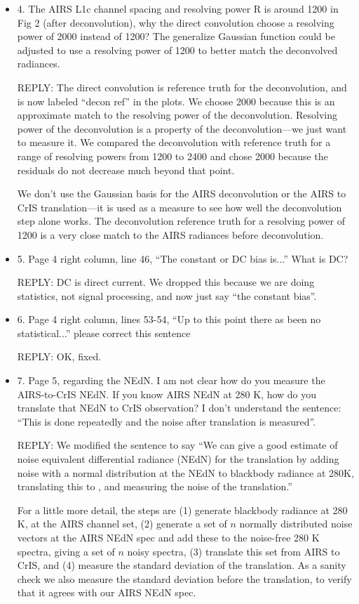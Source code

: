 \documentclass[11pt]{article}
\newcommand {\reply} {\mbox{\small REPLY}}
\begin{document}
\begin{itemize}
  \item 4. The AIRS L1c channel spacing and resolving power R is
    around 1200 in Fig 2 (after deconvolution), why the direct
    convolution choose a resolving power of 2000 instead of 1200?
    The generalize Gaussian function could be adjusted to use a
    resolving power of 1200 to better match the deconvolved
    radiances.

    \reply: The direct convolution is reference truth for the
    deconvolution, and is now labeled ``decon ref'' in the plots.
    We choose 2000 because this is an approximate match to the
    resolving power of the deconvolution.  Resolving power of the
    deconvolution is a property of the deconvolution---we just want
    to measure it.  We compared the deconvolution with reference
    truth for a range of resolving powers from 1200 to 2400 and
    chose 2000 because the residuals do not decrease much beyond
    that point.

    We don't use the Gaussian basis for the AIRS deconvolution or
    the AIRS to CrIS translation---it is used as a measure to see
    how well the deconvolution step alone works.  The deconvolution
    reference truth for a resolving power of 1200 is a very close
    match to the AIRS radiances before deconvolution.

  \item 5. Page 4 right column, line 46, ``The constant or DC bias
    is...''  What is DC?

    \reply: DC is direct current.  We dropped this because we are
    doing statistics, not signal processing, and now just say ``the
    constant bias''.

  \item 6. Page 4 right column, lines 53-54, ``Up to this point
    there as been no statistical...'' please correct this sentence

    \reply: OK, fixed.

  \item 7. Page 5, regarding the NEdN. I am not clear how do you
    measure the AIRS-to-CrIS NEdN. If you know AIRS NEdN at 280 K,
    how do you translate that NEdN to CrIS observation? I don’t
    understand the sentence: ``This is done repeatedly and the noise
    after translation is measured''.

    \reply: We modified the sentence to say ``We can give a good
    estimate of noise equivalent differential radiance (NEdN) for
    the translation by adding noise with a normal distribution at
    the {\airs} NEdN to blackbody radiance at 280K, translating this
    to {\cris}, and measuring the noise of the translation.''

    For a little more detail, the steps are (1) generate blackbody
    radiance at 280 K, at the AIRS channel set, (2) generate a set
    of $n$ normally distributed noise vectors at the AIRS NEdN spec
    and add these to the noise-free 280 K spectra, giving a set of
    $n$ noisy spectra, (3) translate this set from AIRS to CrIS, and
    (4) measure the standard deviation of the translation.  As a
    sanity check we also measure the standard deviation before the
    translation, to verify that it agrees with our AIRS NEdN spec.

\end{itemize}
\end{document}

